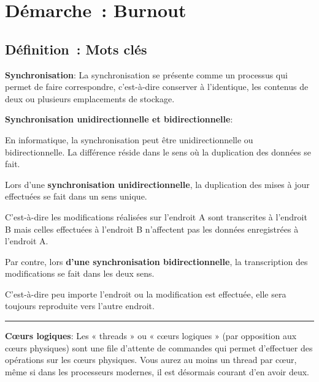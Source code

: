 \newpage
\section*{Démarche~: Burnout}


\subsection*{Définition~: Mots clés}
{}

\noindent \textbf{Synchronisation}:
\noindent La synchronisation se présente comme un processus qui permet de faire correspondre, c'est-à-dire conserver à l'identique, les contenus de deux ou plusieurs emplacements de stockage.

\noindent \textbf{Synchronisation unidirectionnelle et bidirectionnelle}:

\noindent En informatique, la synchronisation peut être unidirectionnelle ou bidirectionnelle. La différence réside dans le sens où la duplication des données se fait.

\noindent Lors d’une \textbf{synchronisation unidirectionnelle}, la duplication des mises à jour effectuées se fait dans un sens unique.

\noindent C’est-à-dire les modifications réalisées sur l’endroit A sont transcrites à l’endroit B mais celles effectuées à l’endroit B n’affectent pas les données enregistrées à l’endroit A.

\noindent Par contre, lors \textbf{d’une synchronisation bidirectionnelle}, la transcription des modifications se fait dans les deux sens.

\noindent C’est-à-dire peu importe l’endroit ou la modification est effectuée, elle sera toujours reproduite vers l’autre endroit.

\begin{center}
\rule{5cm}{0.4pt}
\end{center}

\vspace{0.5cm}

\noindent \textbf{Cœurs logiques}:
\noindent  Les « threads » ou « cœurs logiques » (par opposition aux cœurs physiques) sont une file d'attente de commandes qui permet d'effectuer des opérations sur les cœurs physiques. Vous aurez au moins un thread par cœur, même si dans les processeurs modernes, il est désormais courant d'en avoir deux.


